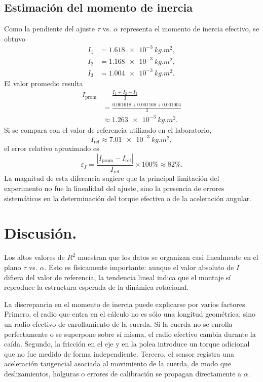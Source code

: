 \documentclass[11pt,twocolumn]{article}
\begin{document}
\subsection{Estimación del momento de inercia}

Como la pendiente del ajuste $\tau$ vs. $\alpha$ representa el momento de inercia efectivo, se obtuvo
\begin{align*}
    I_1 &= \SI{1.618e-3}{kg.m^2},\\
    I_2 &= \SI{1.168e-3}{kg.m^2},\\
    I_3 &= \SI{1.004e-3}{kg.m^2}.
\end{align*}
El valor promedio resulta
\begin{align*}
    I_{\mathrm{prom}}
    &=\frac{I_1+I_2+I_3}{3}\\
    &=\frac{0.001618+0.001168+0.001004}{3}\\
    &\approx \SI{1.263e-3}{kg.m^2}.
\end{align*}
Si se compara con el valor de referencia utilizado en el laboratorio,
\begin{equation*}
    I_{\mathrm{ref}}\approx \SI{7.01e-3}{kg.m^2},
\end{equation*}
el error relativo aproximado es
\begin{equation*}
    \varepsilon_I
    =\frac{|I_{\mathrm{prom}}-I_{\mathrm{ref}}|}{I_{\mathrm{ref}}}\times 100\%
    \approx 82\%.
\end{equation*}
La magnitud de esta diferencia sugiere que la principal limitación del experimento no fue la linealidad del ajuste, sino la presencia de errores sistemáticos en la determinación del torque efectivo o de la aceleración angular.

\section{Discusión.}

Los altos valores de $R^2$ muestran que los datos se organizan casi linealmente en el plano $\tau$ vs. $\alpha$. Esto es físicamente importante: aunque el valor absoluto de $I$ difiera del valor de referencia, la tendencia lineal indica que el montaje sí reproduce la estructura esperada de la dinámica rotacional.

La discrepancia en el momento de inercia puede explicarse por varios factores. Primero, el radio que entra en el cálculo no es sólo una longitud geométrica, sino un radio efectivo de enrollamiento de la cuerda. Si la cuerda no se enrolla perfectamente o se superpone sobre sí misma, el radio efectivo cambia durante la caída. Segundo, la fricción en el eje y en la polea introduce un torque adicional que no fue medido de forma independiente. Tercero, el sensor registra una aceleración tangencial asociada al movimiento de la cuerda, de modo que deslizamientos, holguras o errores de calibración se propagan directamente a $\alpha$.
\end{document}
